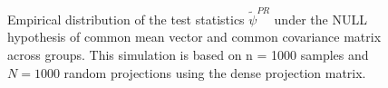 \documentclass[times,sort&compress,3p]{elsarticle}
\theoremstyle{plain}%
\theoremstyle{definition}
\begin{document}
\begin{figure}
  \centering
{}
{}
\caption{Empirical distribution of the test statistics $\widetilde{\psi}^{PR}$ under the NULL hypothesis of common mean vector and common covariance matrix across groups. This simulation is based on n = 1000 samples and $N = 1000$ random projections using the dense projection matrix.}
  \label{fig:BFh0}
\end{figure}
\end{document}
